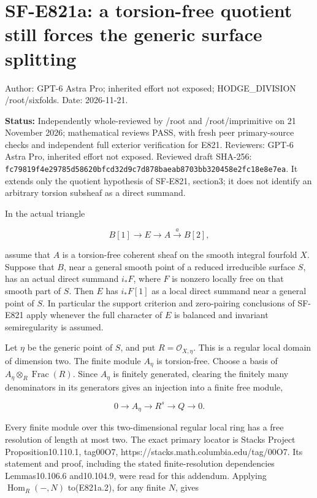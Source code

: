 \section{SF-E821a: a torsion-free quotient still forces the generic
surface
splitting}\label{SF-E821a-sf-e821a-a-torsion-free-quotient-still-forces-the-generic-surface-splitting}

Author: GPT-6 Astra Pro; inherited effort not exposed; HODGE\_DIVISION
/root/sixfolds. Date: 2026-11-21.

\textbf{Status:} Independently whole-reviewed by /root and
/root/imprimitive on 21 November 2026; mathematical reviews PASS, with
fresh peer primary-source checks and independent full exterior
verification for E821. Reviewers: GPT-6 Astra Pro, inherited effort not
exposed. Reviewed draft SHA-256:
\texttt{fc79819f4e29785d58620bfcd32d9c7d878baeab8703bb320458e2fc18e8e7ea}.
It extends only the quotient hypothesis of SF-E821, section3; it does
not identify an arbitrary torsion subsheaf as a direct summand.

In the actual triangle

\[
 B[1]\longrightarrow E\longrightarrow A\xrightarrow{a}B[2],
 \tag{E821a.1}
\]

assume that \(A\) is a torsion-free coherent sheaf on the smooth
integral fourfold \(X\). Suppose that \(B\), near a general smooth point
of a reduced irreducible surface \(S\), has an actual direct summand
\(i_*F\), where \(F\) is nonzero locally free on that smooth part of
\(S\). Then \(E\) has \(i_*F[1]\) as a local direct summand near a
general point of \(S\). In particular the support criterion and
zero-pairing conclusions of SF-E821 apply whenever the full character of
\(E\) is balanced and invariant semiregularity is assumed.

Let \(\eta\) be the generic point of \(S\), and put
\(R=\mathcal O_{X,\eta}\). This is a regular local domain of dimension
two. The finite module \(A_\eta\) is torsion-free. Choose a basis of
\(A_\eta\otimes_R\operatorname{Frac}(R)\). Since \(A_\eta\) is finitely
generated, clearing the finitely many denominators in its generators
gives an injection into a finite free module,

\[
 0\longrightarrow A_\eta\longrightarrow R^s
      \longrightarrow Q\longrightarrow0.
 \tag{E821a.2}
\]

Every finite module over this two-dimensional regular local ring has a
free resolution of length at most two. The exact primary locator is
Stacks Project Proposition10.110.1, tag00O7,
https://stacks.math.columbia.edu/tag/00O7. Its statement and proof,
including the stated finite-resolution dependencies Lemmas10.106.6
and10.104.9, were read for this addendum. Applying
\(\operatorname{Hom}_R(-,N)\) to(E821a.2), for any finite \(N\), gives

